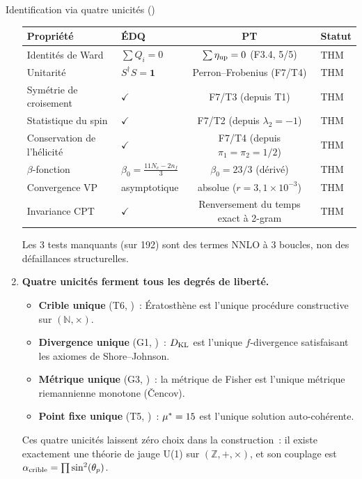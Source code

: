 \documentclass[12pt,a4paper]{article}
\begin{document}
\begin{thmbox}{Identification via quatre unicités (\BRIDGETAG)}
\begin{enumerate}[leftmargin=*, label=\textbf{(\roman*)}]
  \begin{center}
  \begin{tabular}{llcl}
  \toprule
  \textbf{Propriété} & \textbf{ÉDQ} & \textbf{PT} & \textbf{Statut} \\
  \midrule
  Identités de Ward & $\sum Q_i = 0$ & $\sum \eta_{\rm up} = 0$ (F3.4, 5/5) & THM \\
  Unitarité & $S^\dagger S = \mathbf{1}$ & Perron--Frobenius (F7/T4) & THM \\
  Symétrie de croisement & $\checkmark$ & F7/T3 (depuis T1) & THM \\
  Statistique du spin & $\checkmark$ & F7/T2 (depuis $\lambda_2 = -1$) & THM \\
  Conservation de l'hélicité & $\checkmark$ & F7/T4 (depuis $\pi_1=\pi_2=1/2$) & THM \\
  $\beta$-fonction & $\beta_0 = \frac{11N_c-2n_f}{3}$ & $\beta_0 = 23/3$ (dérivé) & THM \\
  Convergence VP & asymptotique & absolue ($r = 3{,}1\!\times\!10^{-3}$) & THM \\
  Invariance CPT & $\checkmark$ & Renversement du temps exact à 2-gram & THM \\
  \bottomrule
  \end{tabular}
  \end{center}
  Les 3 tests manquants (sur 192) sont des termes NNLO à 3 boucles,
  non des défaillances structurelles.

\item \textbf{Quatre unicités ferment tous les degrés de liberté.}
  \begin{itemize}[nosep]
  \item \textbf{Crible unique} (T6, \cite{companion_M2})~:
    Ératosthène est l'unique procédure constructive sur
    $(\mathbb{N}, \times)$.
  \item \textbf{Divergence unique} (G1, \cite{companion_M2})~:
    $D_{\mathrm{KL}}$ est l'unique $f$-divergence satisfaisant les axiomes
    de Shore--Johnson.
  \item \textbf{Métrique unique} (G3, \cite{companion_M2})~: la
    métrique de Fisher est l'unique métrique riemannienne monotone
    (\v{C}encov).
  \item \textbf{Point fixe unique} (T5, \cite{companion_M3})~:
    ${\mu^{*}} = 15$ est l'unique solution auto-cohérente.
  \end{itemize}
  Ces quatre unicités laissent zéro choix dans la construction~:
  il existe exactement une théorie de jauge U(1) sur
  $(\mathbb{Z}, +, \times)$, et son couplage est
  $\alpha_{\rm crible} = \prod \sin^2(\theta_{p})$.


\end{enumerate}
\end{thmbox}
\end{document}
